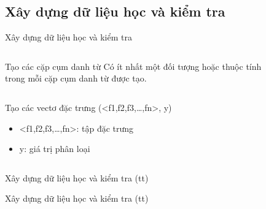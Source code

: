 \documentclass[9pt,xcolor=table]{beamer}
\begin{document}
	\subsection{Xây dựng dữ liệu học và kiểm tra}
	\begin{frame}{Xây dựng dữ liệu học và kiểm tra}				
		\begin{columns}[t]
			\begin{column}{0.4\textwidth}
			   	\begin{block}{Tạo các cặp cụm danh từ}
					Có ít nhất một đối tượng hoặc thuộc tính trong mỗi cặp cụm danh từ được tạo.
				\end{block}
			\end{column}
			\begin{column}{0.6\textwidth}  %
			 	\begin{figure}[H]
					\LARGE 
					\centering				
					\resizebox{65mm}{!}{}	
				\end{figure}
			\end{column}
		\end{columns}
		\begin{columns}[t]
			\begin{column}{\textwidth}
			   	\begin{block}{Tạo các vectơ đặc trưng}										
					(<f1,f2,f3,…,fn>, y)
					\begin{itemize}
						\item{<f1,f2,f3,…,fn>: tập đặc trưng}
						\item{y: giá trị phân loại}										
					\end{itemize}
				\end{block}					
			\end{column}			
		\end{columns}
	\end{frame}	

	\begin{frame}{Xây dựng dữ liệu học và kiểm tra (tt)}		
		\begin{table}[]		
		\parbox{\textwidth}{
			\centering			
			\fontsize{6pt}{7}\selectfont		
				
			\caption{Các đặc trưng được sử dụng trong hệ thống}
		}
		\end{table}
	\end{frame}	

	\begin{frame}{Xây dựng dữ liệu học và kiểm tra (tt)}		
		\begin{table}[]		
		\parbox{\textwidth}{
			\centering
			\fontsize{6pt}{7}\selectfont			
				
			\caption{Các đặc trưng được sử dụng trong hệ thống (tt)}
		}
		\end{table}
	\end{frame}
\end{document}
